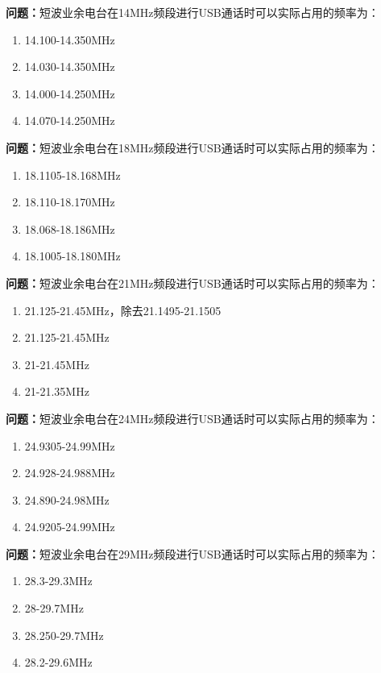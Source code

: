 \bigskip


\noindent\textbf{问题：}短波业余电台在14MHz频段进行USB通话时可以实际占用的频率为：
\begin{enumerate}[label=\Alph*), leftmargin=3em]
\item 14.100-14.350MHz
\item 14.030-14.350MHz
\item 14.000-14.250MHz
\item 14.070-14.250MHz
\end{enumerate}

\bigskip


\noindent\textbf{问题：}短波业余电台在18MHz频段进行USB通话时可以实际占用的频率为：
\begin{enumerate}[label=\Alph*), leftmargin=3em]
\item 18.1105-18.168MHz
\item 18.110-18.170MHz
\item 18.068-18.186MHz
\item 18.1005-18.180MHz
\end{enumerate}

\bigskip


\noindent\textbf{问题：}短波业余电台在21MHz频段进行USB通话时可以实际占用的频率为：
\begin{enumerate}[label=\Alph*), leftmargin=3em]
\item 21.125-21.45MHz，除去21.1495-21.1505
\item 21.125-21.45MHz
\item 21-21.45MHz
\item 21-21.35MHz
\end{enumerate}

\bigskip


\noindent\textbf{问题：}短波业余电台在24MHz频段进行USB通话时可以实际占用的频率为：
\begin{enumerate}[label=\Alph*), leftmargin=3em]
\item 24.9305-24.99MHz
\item 24.928-24.988MHz
\item 24.890-24.98MHz
\item 24.9205-24.99MHz
\end{enumerate}

\bigskip


\noindent\textbf{问题：}短波业余电台在29MHz频段进行USB通话时可以实际占用的频率为：
\begin{enumerate}[label=\Alph*), leftmargin=3em]
\item 28.3-29.3MHz
\item 28-29.7MHz
\item 28.250-29.7MHz
\item 28.2-29.6MHz
\end{enumerate}

